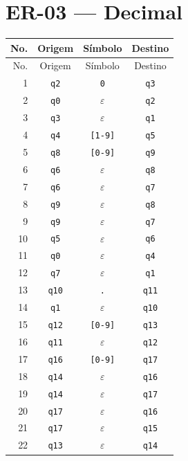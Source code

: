 \documentclass[12pt,a4paper,oneside]{report}
\begin{document}
\section{ER-03 --- Decimal}
\small
\begin{longtable}{|r|c|c|c|}
\toprule
No. & Origem & Símbolo & Destino \\
\midrule
\endfirsthead
\toprule
No. & Origem & Símbolo & Destino \\
\midrule
\endhead
1 & \texttt{q2} & \texttt{0} & \texttt{q3} \\
2 & \texttt{q0} & $\varepsilon$ & \texttt{q2} \\
3 & \texttt{q3} & $\varepsilon$ & \texttt{q1} \\
4 & \texttt{q4} & \texttt{[1-9]} & \texttt{q5} \\
5 & \texttt{q8} & \texttt{[0-9]} & \texttt{q9} \\
6 & \texttt{q6} & $\varepsilon$ & \texttt{q8} \\
7 & \texttt{q6} & $\varepsilon$ & \texttt{q7} \\
8 & \texttt{q9} & $\varepsilon$ & \texttt{q8} \\
9 & \texttt{q9} & $\varepsilon$ & \texttt{q7} \\
10 & \texttt{q5} & $\varepsilon$ & \texttt{q6} \\
11 & \texttt{q0} & $\varepsilon$ & \texttt{q4} \\
12 & \texttt{q7} & $\varepsilon$ & \texttt{q1} \\
13 & \texttt{q10} & \texttt{.} & \texttt{q11} \\
14 & \texttt{q1} & $\varepsilon$ & \texttt{q10} \\
15 & \texttt{q12} & \texttt{[0-9]} & \texttt{q13} \\
16 & \texttt{q11} & $\varepsilon$ & \texttt{q12} \\
17 & \texttt{q16} & \texttt{[0-9]} & \texttt{q17} \\
18 & \texttt{q14} & $\varepsilon$ & \texttt{q16} \\
19 & \texttt{q14} & $\varepsilon$ & \texttt{q17} \\
20 & \texttt{q17} & $\varepsilon$ & \texttt{q16} \\
21 & \texttt{q17} & $\varepsilon$ & \texttt{q15} \\
22 & \texttt{q13} & $\varepsilon$ & \texttt{q14} \\
\bottomrule
\end{longtable}
\end{document}
